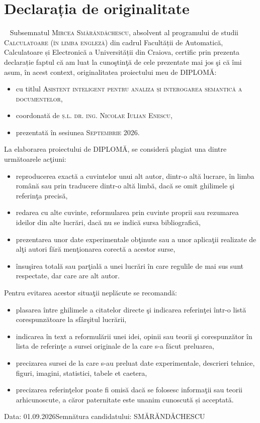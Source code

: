 \chapter*{Declarația de originalitate}
~
Subsemnatul \textsc{Mircea Smărăndăchescu}, absolvent al programului de studii \textsc{Calculatoare (în limba engleză)} din cadrul Facultății de Automatică, Calculatoare și Electronică a Universității din Craiova, certific prin prezenta declarație faptul că am luat la cunoştinţă de cele prezentate mai jos şi că îmi asum, în acest context, originalitatea proiectului meu de \textsc{DIPLOMĂ}:
\begin{itemize}
	\item cu titlul \textsc{Asistent inteligent pentru analiza și interogarea semantică a documentelor},
	\item coordonată de \textsc{ș.l. dr. ing. Nicolae Iulian Enescu},
	\item prezentată în sesiunea \textsc{Septembrie 2026}.
\end{itemize}	
	La elaborarea proiectului de \textsc{DIPLOMĂ}, se consideră plagiat una dintre următoarele acţiuni: 
\begin{itemize}	
	\item reproducerea exactă a cuvintelor unui alt autor, dintr-o altă lucrare, în limba română sau prin traducere dintr-o altă limbă, dacă se omit ghilimele şi referinţa precisă, 
	\item redarea cu alte cuvinte, reformularea prin cuvinte proprii sau rezumarea ideilor din alte lucrări, dacă nu se indică sursa bibliografică, 
	\item prezentarea unor date experimentale obţinute sau a unor aplicaţii realizate de alţi autori fără menţionarea corectă a acestor surse, 
	\item însuşirea totală sau parţială a unei lucrări în care regulile de mai sus sunt respectate, dar care are alt autor. 
\end{itemize}
	Pentru evitarea acestor situaţii neplăcute se recomandă: 
\begin{itemize}	
	\item plasarea între ghilimele a citatelor directe şi indicarea referinţei într-o listă corespunzătoare la sfârşitul lucrării,
	\item indicarea în text a reformulării unei idei, opinii sau teorii şi corespunzător în lista de referinţe a sursei originale de la care s-a făcut preluarea, 
	\item precizarea sursei de la care s-au preluat date experimentale, descrieri tehnice, figuri, imagini, statistici, tabele et caetera, 
	\item precizarea referinţelor poate fi omisă dacă se folosesc informaţii sau teorii arhicunoscute, a căror paternitate este unanim cunoscută și acceptată. 
\end{itemize}

\vspace*{\fill}
Data: 01.09.2026\hfill Semnătura candidatului: SMĂRĂNDĂCHESCU
\vspace{\fill}
